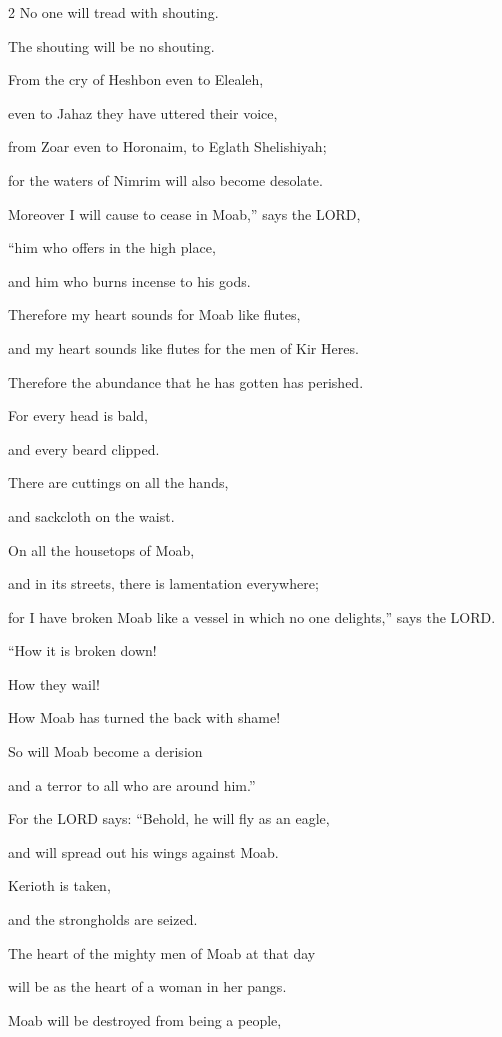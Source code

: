 \begin{multicols}{2}
No one will tread with shouting.

The shouting will be no shouting.


\myverse{}From the cry of Heshbon even to Elealeh,

even to Jahaz they have uttered their voice,

from Zoar even to Horonaim, to Eglath Shelishiyah;

for the waters of Nimrim will also become desolate.


\myverse{}Moreover I will cause to cease in Moab,” says the LORD,

“him who offers in the high place,

and him who burns incense to his gods.


\myverse{}Therefore my heart sounds for Moab like flutes,

and my heart sounds like flutes for the men of Kir Heres.

Therefore the abundance that he has gotten has perished.


\myverse{}For every head is bald,

and every beard clipped.

There are cuttings on all the hands,

and sackcloth on the waist.


\myverse{}On all the housetops of Moab,

and in its streets, there is lamentation everywhere;

for I have broken Moab like a vessel in which no one delights,” says the LORD.


\myverse{}“How it is broken down!

How they wail!

How Moab has turned the back with shame!

So will Moab become a derision

and a terror to all who are around him.”


\myverse{}For the LORD says: “Behold, he will fly as an eagle,

and will spread out his wings against Moab.


\myverse{}Kerioth is taken,

and the strongholds are seized.

The heart of the mighty men of Moab at that day

will be as the heart of a woman in her pangs.


\myverse{}Moab will be destroyed from being a people,


\end{multicols}
